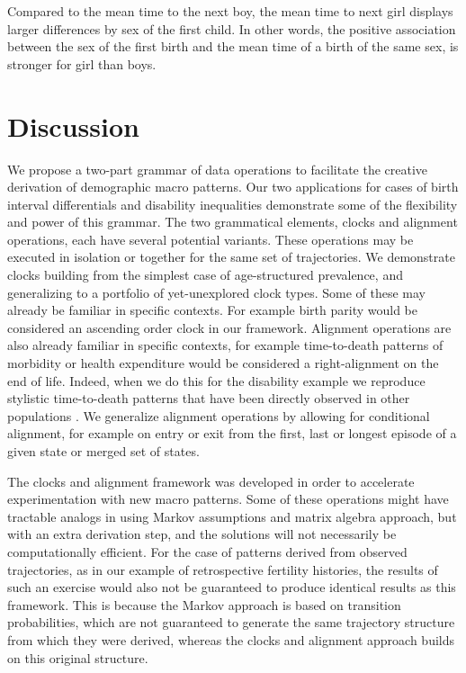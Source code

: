\documentclass{article}
\begin{document}
Compared to the mean time to the next boy, the mean time to next girl displays larger differences by sex of the first child. In other words, the positive association between the sex of the first birth and the mean time of a birth of the same sex, is stronger for girl than boys.

\section{Discussion}

We propose a two-part grammar of data operations to facilitate the creative derivation of demographic macro patterns. Our two applications for cases of birth interval differentials and disability inequalities demonstrate some of the flexibility and power of this grammar. The two grammatical elements, clocks and alignment operations, each have several potential variants. These operations may be executed in isolation or together for the same set of trajectories. We demonstrate clocks building from the simplest case of age-structured prevalence, and generalizing to a portfolio of yet-unexplored clock types. Some of these may already be familiar in specific contexts. For example birth parity would be considered an ascending order clock in our framework. Alignment operations are also already familiar in specific contexts, for example time-to-death patterns of morbidity or health expenditure would be considered a right-alignment on the end of life. Indeed, when we do this for the disability example we reproduce stylistic time-to-death patterns that have been directly observed in other populations \citep{klijs2010disability, riffe2016time}. We generalize alignment operations by allowing for conditional alignment, for example on entry or exit from the first, last or longest episode of a given state or merged set of states.

The clocks and alignment framework was developed in order to accelerate experimentation with new macro patterns. Some of these operations might have tractable analogs in using Markov assumptions and matrix algebra approach, but with an extra derivation step, and the solutions will not necessarily be computationally efficient. For the case of patterns derived from observed trajectories, as in our example of retrospective fertility histories, the results of such an exercise would also not be guaranteed to produce identical results as this framework. This is because the Markov approach is based on transition probabilities, which are not guaranteed to generate the same trajectory structure from which they were derived, whereas the clocks and alignment approach builds on this original structure. 
\end{document}

